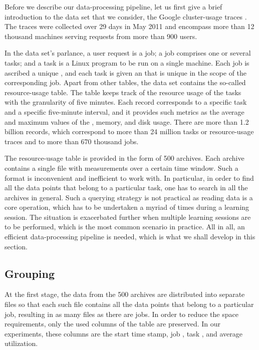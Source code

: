 Before we describe our data-processing pipeline, let us first give a brief
introduction to the data set that we consider, the Google cluster-usage traces
\cite{reiss2011}. The traces were collected over 29 days in May 2011 and
encompass more than 12 thousand machines serving requests from more than 900
users.

In the data set's parlance, a user request is a job; a job comprises one or
several tasks; and a task is a Linux program to be run on a single machine.
Each job is ascribed a unique , and each task is given an  that is
unique in the scope of the corresponding job. Apart from other tables, the data
set contains the so-called resource-usage table. The table keeps track of the
resource usage of the tasks with the granularity of five minutes. Each record
corresponds to a specific task and a specific five-minute interval, and it
provides such metrics as the average and maximum values of the , memory,
and disk usage. There are more than 1.2 billion records, which correspond to
more than 24 million tasks or resource-usage traces and to more than 670
thousand jobs.

The resource-usage table is provided in the form of 500 archives. Each archive
contains a single  file with measurements over a certain time window.
Such a format is inconvenient and inefficient to work with. In particular, in
order to find all the data points that belong to a particular task, one has to
search in all the archives in general. Such a querying strategy is not practical
as reading data is a core operation, which has to be undertaken a myriad of
times during a learning session. The situation is exacerbated further when
multiple learning sessions are to be performed, which is the most common
scenario in practice. All in all, an efficient data-processing pipeline is
needed, which is what we shall develop in this section.

\subsection{Grouping} 
At the first stage, the  data from the 500 archives are distributed into
separate  files so that each such file contains all the data points that
belong to a particular job, resulting in as many  files as there are
jobs. In order to reduce the space requirements, only the used columns of the
table are preserved. In our experiments, these columns are the start time stamp,
job , task , and average  utilization.

